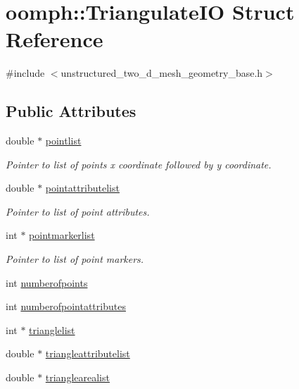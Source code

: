 \hypertarget{structoomph_1_1TriangulateIO}{}\section{oomph\+:\+:Triangulate\+IO Struct Reference}
\label{structoomph_1_1TriangulateIO}


{\ttfamily \#include $<$unstructured\+\_\+two\+\_\+d\+\_\+mesh\+\_\+geometry\+\_\+base.\+h$>$}

\subsection*{Public Attributes}
\begin{DoxyCompactItemize}
\item 
double $\ast$ \hyperlink{structoomph_1_1TriangulateIO_a479764c149b3afff010537ac129c8c3c}{pointlist}
\begin{DoxyCompactList}\small\item\em Pointer to list of points x coordinate followed by y coordinate. \end{DoxyCompactList}\item 
double $\ast$ \hyperlink{structoomph_1_1TriangulateIO_abfbccde367584c0b55a0513bf9e8b929}{pointattributelist}
\begin{DoxyCompactList}\small\item\em Pointer to list of point attributes. \end{DoxyCompactList}\item 
int $\ast$ \hyperlink{structoomph_1_1TriangulateIO_a6cb00e7065cf31b764a532f7c7f1e009}{pointmarkerlist}
\begin{DoxyCompactList}\small\item\em Pointer to list of point markers. \end{DoxyCompactList}\item 
int \hyperlink{structoomph_1_1TriangulateIO_a56b30cea17878e957906eed61f53a9c2}{numberofpoints}
\item 
int \hyperlink{structoomph_1_1TriangulateIO_acfe3391dd2b35a7f04de5935c112678c}{numberofpointattributes}
\item 
int $\ast$ \hyperlink{structoomph_1_1TriangulateIO_a53c9e2c787d52b89c8c9434e3983a57b}{trianglelist}
\item 
double $\ast$ \hyperlink{structoomph_1_1TriangulateIO_aa8bbc97ce309d32e0695ac703a0817b7}{triangleattributelist}
\item 
double $\ast$ \hyperlink{structoomph_1_1TriangulateIO_a9a976d4e6a020e3be97fab821a96fd66}{trianglearealist}

\end{DoxyCompactItemize}
